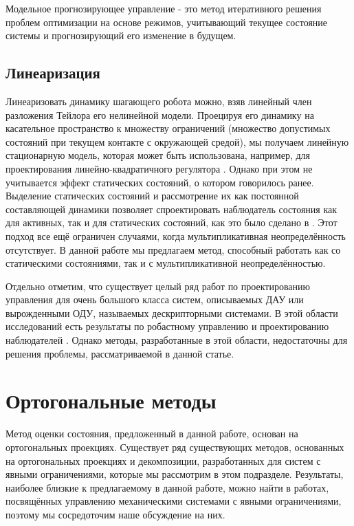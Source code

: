Модельное прогнозирующее управление - это метод итеративного решения проблем оптимизации на основе режимов, учитывающий текущее состояние системы и прогнозирующий его изменение в будущем.

\subsection{Линеаризация}\label{sec:ch1/sec2/sub5}
Линеаризовать динамику шагающего робота можно, взяв линейный член разложения Тейлора его нелинейной модели. Проецируя его динамику на касательное пространство к множеству ограничений (множество допустимых состояний при текущем контакте с окружающей средой), мы получаем линейную стационарную модель, которая может быть использована, например, для проектирования линейно-квадратичного регулятора \cite{mason2014full}. Однако при этом не учитывается эффект статических состояний, о котором говорилось ранее. Выделение статических состояний и рассмотрение их как постоянной составляющей динамики позволяет спроектировать наблюдатель состояния как для активных, так и для статических состояний, как это было сделано в \cite{SAVIN2021}. Этот подход все ещё ограничен случаями, когда мультипликативная неопределённость отсутствует. В данной работе мы предлагаем метод, способный работать как со статическими состояниями, так и с мультипликативной неопределённостью.

Отдельно отметим, что существует целый ряд работ по проектированию управления для очень большого класса систем, описываемых ДАУ или вырожденными ОДУ, называемых дескрипторными системами. В этой области исследований есть результаты по робастному управлению и проектированию наблюдателей \cite{Cheng2018, Darouach2014}. Однако методы, разработанные в этой области, недостаточны для решения проблемы, рассматриваемой в данной статье.

\section{Ортогональные методы}\label{sec:ch1/sec3}
Метод оценки состояния, предложенный в данной работе, основан на ортогональных проекциях. Существует ряд существующих методов, основанных на ортогональных проекциях и декомпозиции, разработанных для систем с явными ограничениями, которые мы рассмотрим в этом подразделе. Результаты, наиболее близкие к предлагаемому в данной работе, можно найти в работах, посвящённых управлению механическими системами с явными ограничениями, поэтому мы сосредоточим наше обсуждение на них.

